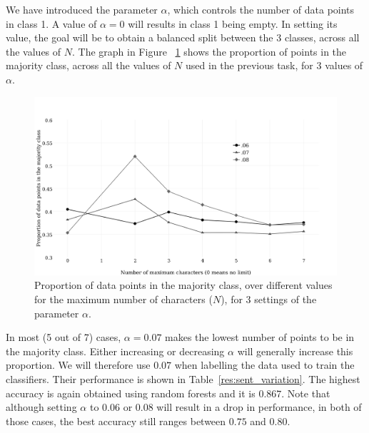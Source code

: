 \documentclass[bsc,frontabs,deptreport,singlespacing,parskip, twoside]{infthesis}
\begin{document}
We have introduced the parameter $\alpha$, which controls the number of data points in class 1. A value of $\alpha=0$ will results in class 1 being empty. In setting its value, the goal will be to obtain a balanced split between the 3 classes, across all the values of $N$. The graph in Figure ~\ref{fig:alpha} shows the proportion of points in the majority class, across all the values of $N$ used in the previous task, for 3 values of $\alpha$.

\begin{figure}[h!]
\begin{adjustwidth}{-0.7in}{-0.7in}
	\centering
	\includegraphics[scale=0.55]{figures/variation_alpha2}
	\caption{Proportion of data points in the majority class, over different values for the maximum number of characters ($N$), for 3 settings of the parameter $\alpha$.}
\label{fig:alpha}
\end{adjustwidth}
\end{figure}

In most (5 out of 7) cases, $\alpha=0.07$ makes the lowest number of points to be in the majority class. Either increasing or decreasing $\alpha$ will generally increase this proportion. We will therefore use $0.07$ when labelling the data used to train the classifiers. Their performance is shown in Table~\ref{res:sent_variation}. The highest accuracy is again obtained using random forests and it is $0.867$. Note that although setting $\alpha$ to $0.06$ or $0.08$ will result in a drop in performance,  in both of those cases, the best accuracy still ranges between $0.75$ and $0.80$.
\end{document}
